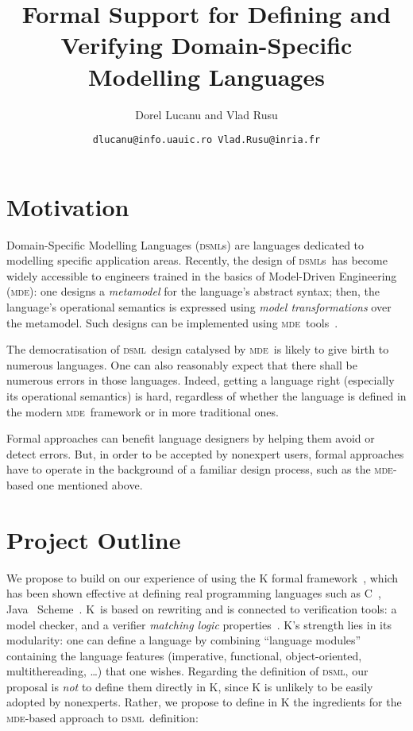 \documentclass[a4paper,11pt,twoside]{article}
\title{Formal Support for Defining and Verifying Domain-Specific Modelling Languages}
\author{Dorel Lucanu and Vlad Rusu}
\date{\texttt{dlucanu@info.uauic.ro \quad Vlad.Rusu@inria.fr}}
\newcommand{\dsml}{\textsc{dsml}}
\newcommand{\dsmls}{\textsc{dsml}s}
\newcommand{\mde}{\textsc{mde}}
\begin{document}
\pagestyle{plain}
\maketitle

\section*{Motivation}
Domain-Specific Modelling Languages (\dsmls) are languages dedicated to modelling specific application areas. Recently, the design of \dsmls\
has become widely accessible to engineers trained in the basics of Model-Driven Engineering (\mde): one designs
 a \emph{metamodel} for the language's abstract syntax; then, the language's operational semantics is expressed using \emph{model transformations} over
the metamodel. Such designs can be implemented using  \mde\ tools~\cite{DBLP:conf/uml/MullerFJ05,DBLP:journals/scp/JouaultABK08,qvt}.

The democratisation of  \dsml\ design catalysed by \mde\ is likely to give birth to  numerous languages. 
One can also reasonably expect that there shall be  numerous errors in those languages. Indeed, getting a language right (especially its operational semantics)
is  hard, regardless of whether the language is defined  in the  modern \mde\ framework or in   more traditional ones.

Formal approaches can benefit language designers by helping them  avoid or detect errors. But, in order to be
accepted by nonexpert users, formal approaches have to 
operate in the background of a familiar design process,  such as the \mde-based one mentioned above.



\section*{Project Outline}
We propose to build on our experience of using the K formal framework~\cite{rosu-serbanuta-2010-jlap}, which has been shown effective at  defining real programming languages such as C~\cite{ellison-rosu-2010-tr},  
Java~\cite{farzan-chen-meseguer-rosu-2004-cav}
Scheme~\cite{meredith-hills-rosu-2007-tr-b}.
K~is based on rewriting and is connected to verification tools: a model checker, and a verifier 
 \emph{matching logic} properties~\cite{rosu-ellison-schulte-2010-amast}.
K's strength  lies in its modularity: one can define a language by combining ``language modules'' containing the  language features (imperative, functional, object-oriented, multithereading, \ldots) that one wishes. Regarding the definition of \dsml, our proposal is \emph{not} to define them directly in K, since 
K is unlikely to be easily adopted by nonexperts. Rather, we propose to define in K the ingredients for the  \mde-based approach to \dsml\ definition:
\end{document}
